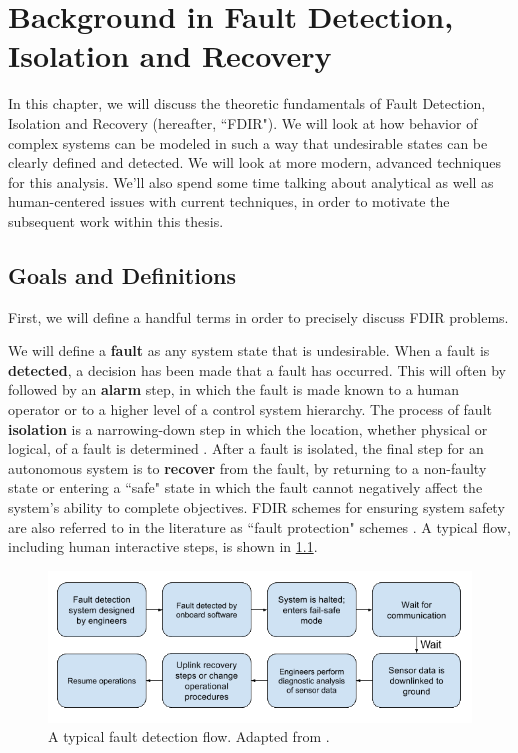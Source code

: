 \chapter{Background in Fault Detection, Isolation and Recovery}

In this chapter, we will discuss the theoretic fundamentals of Fault Detection, Isolation and Recovery (hereafter, ``FDIR"). We will look at how behavior of complex systems can be modeled in such a way that undesirable states can be clearly defined and detected. We will look at more modern, advanced techniques for this analysis. We'll also spend some time talking about analytical as well as human-centered issues with current techniques, in order to motivate the subsequent work within this thesis.

\section{Goals and Definitions}

First, we will define a handful terms in order to precisely discuss FDIR problems.

We will define a \textbf{fault} as any system state that is undesirable. When a fault is \textbf{detected}, a decision has been made that a fault has occurred. This will often by followed by an \textbf{alarm} step, in which the fault is made known to a human operator or to a higher level of a control system hierarchy. The process of fault \textbf{isolation} is a narrowing-down step in which the location, whether physical or logical, of a fault is determined \cite{schwabacher2008pre}. After a fault is isolated, the final step for an autonomous system is to \textbf{recover} from the fault, by returning to a non-faulty state or entering a ``safe" state in which the fault cannot negatively affect the system's ability to complete objectives. FDIR schemes for ensuring system safety are also referred to in the literature as ``fault protection" schemes \cite{kurien2010intrinsic}. A typical flow, including human interactive steps, is shown in \ref{fig:fp_flow}.

\begin{figure}[h]
\centering
    \includegraphics[width=\columnwidth]{images/fp_flow2.png}
    \caption{A typical fault detection flow. Adapted from \cite{kurien2010intrinsic}.}
    \label{fig:fp_flow}
\end{figure}

